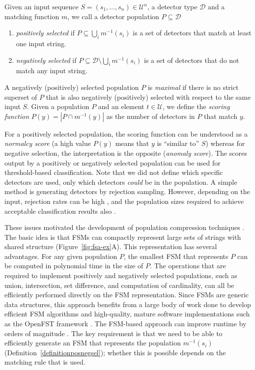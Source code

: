 \documentclass{llncs}
\begin{document}
\begin{definition}
Given an input sequence  $S=(s_1,\ldots,s_n) \in \mathcal{U}^n$,
a detector type $\mathcal{D}$ and a matching function $m$,  we call a 
detector population $P \subseteq \mathcal{D}$
\begin{enumerate}
\item \emph{positively selected} if $P \subseteq \bigcup_i m^{-1}(s_i)$ is a set of detectors 
that match at least one input string.
\item \emph{negatively selected} if $P \subseteq \mathcal{D} \setminus \bigcup_i m^{-1}(s_i)$ 
is a set of detectors that do not match any input string. 
\end{enumerate}

A negatively (positively) selected population $P$ is \emph{maximal} if there is no strict superset of $P$ that is also negatively (positively) selected with respect to the same input $S$. Given a population $P$ and an element $t \in \mathcal{U}$, we define the \emph{scoring function} $P(y) =  |P \cap m^{-1}(y)|$ as the number of detectors in $P$ that match $y$. 
\label{definitionposnegsel} %
\end{definition}

For a positively selected population, the scoring function can be understood as a \emph{normalcy score} (a high value $P(y)$ means that $y$ is ``similar to'' $S$) whereas for negative selection, the interpretation is the opposite (\emph{anomaly score}). The scores output by a positively or negatively selected population can be used for threshold-based classification. Note that we did not define which specific detectors are used, only which detectors \emph{could} be in the population. A simple method is generating detectors by rejection sampling. However, depending on the input, rejection rates can be high \cite{Dhaeseleer1996,Dhaeseleer1996b}, and the population sizes required to achieve acceptable classification results also %
\cite{Stibor2005}. 

These issues motivated the development of population compression 
techniques \cite{Elberfeld_2009,Elberfeld2011}.
The basic idea is that FSMs can compactly represent large sets of strings with 
shared structure (Figure~\ref{fig:fsa-ex}A). This representation has several advantages.
For any given population $P$, the smallest FSM that represents $P$ can be computed in polynomial time in the 
size of $P$. The operations that are required to implement positively and negatively selected populations,
such as union, intersection, set difference, and computation of cardinality, can all be efficiently performed directly 
on the FSM representation.  Since FSMs are generic data structures, this approach benefits 
from a large body of work done to develop efficient FSM algorithms and high-quality, mature software implementations 
such as the OpenFST framework \cite{openfst}. 
The FSM-based approach can improve runtime by orders of 
magnitude \cite{Textor2012,Textor2014}. The key requirement is that we need to be able to efficiently generate
an FSM that represents the population $m^{-1}(s_i)$ (Definition~\ref{definitionposnegsel}); whether this is possible
depends on the matching rule that is used.
\end{document}
